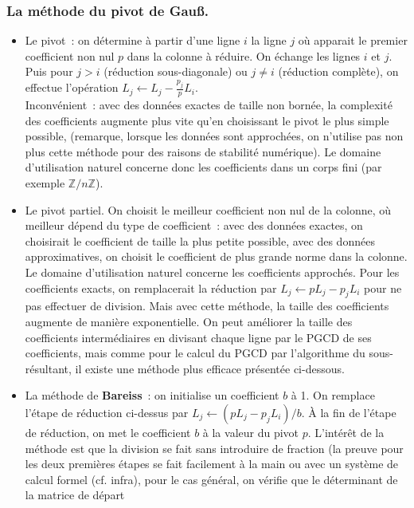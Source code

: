 \documentclass[a4paper,11pt]{article}
\begin{document}
\begin{giacjshere}
\subsubsection{La m\'ethode du pivot de Gau\ss.} 
\begin{itemize}
\item Le pivot~: on détermine à partir d'une ligne $i$ 
la ligne $j$ où apparait le premier coefficient non nul $p$ dans
la colonne à réduire. On échange les lignes
$i$ et $j$. Puis pour $j>i$ (réduction sous-diagonale)
ou $j\neq i$ (réduction complète), on effectue l'opération
$L_j \leftarrow L_j - \frac{p_j}{p}L_i$.\\
Inconv\'enient~: avec des donn\'ees exactes de taille non born\'ee, 
la complexité des coefficients augmente plus vite qu'en choisissant 
le pivot le plus simple possible, (remarque, lorsque les donn\'ees 
sont approch\'ees, on n'utilise pas non plus cette méthode
pour des raisons de stabilit\'e num\'erique).
Le domaine d'utilisation naturel concerne donc les coefficients
dans un corps fini (par exemple $\mathbb{Z}/n\mathbb{Z}$).
\item Le pivot partiel. On choisit le meilleur coefficient non nul de la
colonne, où meilleur dépend du type de coefficient~: avec des données
exactes, on choisirait le coefficient de taille la plus petite possible,
avec des donn\'ees approximatives, on choisit
le coefficient de plus grande norme dans la colonne.
Le domaine d'utilisation naturel concerne les coefficients
approch\'es. Pour les coefficients exacts, on remplacerait la
réduction par $L_j \leftarrow pL_j -p_j L_i$ pour ne pas effectuer
de division. Mais avec cette méthode, la taille des coefficients
augmente de manière exponentielle. On peut améliorer
la taille des coefficients intermédiaires en divisant chaque
ligne par le PGCD de ses coefficients, mais comme pour le
calcul du PGCD par l'algorithme du sous-résultant, il existe
une méthode plus efficace présentée ci-dessous.
\item La m\'ethode de {\bf Bareiss}~: on initialise un coefficient $b$ \`a 1.
On remplace l'\'etape de r\'eduction ci-dessus
par $L_j \leftarrow (pL_j -p_j L_i)/b$.
\`A la fin de l'\'etape de r\'eduction, on met le coefficient $b$
\`a la valeur du pivot $p$. L'intérêt de la méthode est que la division
se fait sans introduire de fraction (la preuve pour les deux premi\`eres
\'etapes se fait facilement \`a la main ou avec
un système de calcul formel (cf. infra), pour le cas g\'en\'eral, on v\'erifie
que le d\'eterminant de la matrice de d\'epart

\end{itemize}
\end{giacjshere}
\end{document}
